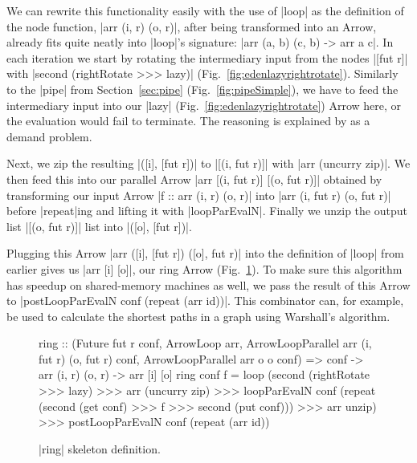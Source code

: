 We can rewrite this functionality easily with the use of |loop| as the definition of the node function, |arr (i, r) (o, r)|, after being transformed into an Arrow, already fits quite neatly into |loop|'s signature: |arr (a, b) (c, b) -> arr a c|. In each iteration we start by rotating the intermediary input from the nodes |[fut r]| with |second (rightRotate >>> lazy)| (Fig.~\ref{fig:edenlazyrightrotate}). Similarly to the |pipe| from Section~\ref{sec:pipe} (Fig.~\ref{fig:pipeSimple}), we have to feed the intermediary input into our |lazy| (Fig.~\ref{fig:edenlazyrightrotate}) Arrow here, or the evaluation would fail to terminate. The reasoning is explained by \citet{Loogen2012} as a demand problem.

Next, we zip the resulting |([i], [fut r])| to |[(i, fut r)]| with |arr (uncurry zip)|. We then feed this into our parallel Arrow |arr [(i, fut r)] [(o, fut r)]| obtained by transforming our input Arrow |f :: arr (i, r) (o, r)| into |arr (i, fut r) (o, fut r)| before |repeat|ing and lifting it with |loopParEvalN|. Finally we unzip the output list |[(o, fut r)]| list into |([o], [fut r])|.

Plugging this Arrow |arr ([i], [fut r]) ([o], fut r)| into the definition of |loop| from earlier gives us |arr [i] [o]|, our ring Arrow (Fig.~\ref{fig:ringFinal}). To make sure this algorithm has speedup on shared-memory machines as well, we pass the result of this Arrow to |postLoopParEvalN conf (repeat (arr id))|.
This combinator can, for example, be used to calculate the shortest paths in a graph using Warshall's algorithm.

\begin{figure}[tb]
\begin{code}
ring :: (Future fut r conf,
    ArrowLoop arr,
    ArrowLoopParallel arr (i, fut r) (o, fut r) conf,
    ArrowLoopParallel arr o o conf) =>
    conf -> arr (i, r) (o, r) -> arr [i] [o]
ring conf f =
    loop (second (rightRotate >>> lazy) >>>
        arr (uncurry zip) >>>
        loopParEvalN conf (repeat (second (get conf) >>> f >>> second (put conf))) >>>
        arr unzip) >>>
    postLoopParEvalN conf (repeat (arr id))
\end{code}
\caption{|ring| skeleton definition.}
\label{fig:ringFinal}
\end{figure}

